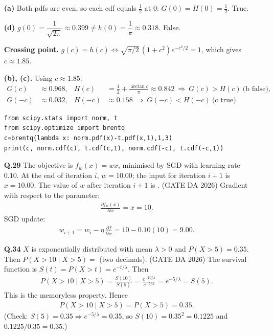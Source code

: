 \begin{enumerate}[label=\textbf{Q.\arabic*},leftmargin=*,start=1]
\textbf{(a)} Both pdfs are even, so each cdf equals $\tfrac12$ at $0$: $G(0)=H(0)=\tfrac12$. True.

\textbf{(d)} $g(0)=\dfrac1{\sqrt{2\pi}}\approx0.399\neq h(0)=\dfrac1\pi\approx0.318$. False.

\textbf{Crossing point.} $g(c)=h(c)\iff\sqrt{\pi/2}\,(1+c^2)e^{-c^2/2}=1$, which gives
$c\approx1.85$.

\textbf{(b), (c).} Using $c\approx1.85$:
\begin{align}
G(c)&\approx0.968,& H(c)&=\tfrac12+\tfrac{\arctan c}{\pi}\approx0.842\ \Rightarrow\ G(c)>H(c)\ \text{(b false)},\\
G(-c)&\approx0.032,& H(-c)&\approx0.158\ \Rightarrow\ G(-c)<H(-c)\ \text{(c true)}.
\end{align}
\begin{lstlisting}
from scipy.stats import norm, t
from scipy.optimize import brentq
c=brentq(lambda x: norm.pdf(x)-t.pdf(x,1),1,3)
print(c, norm.cdf(c), t.cdf(c,1), norm.cdf(-c), t.cdf(-c,1))
\end{lstlisting}

\item[\textbf{Q.29}] The objective is $f_w(x)=wx$, minimised by SGD with learning
rate $0.10$. At the end of iteration $i$, $w=10.00$; the input for iteration $i+1$ is
$x=10.00$. The value of $w$ after iteration $i+1$ is \underline{\hspace{1.5cm}}.
\hfill (GATE DA 2026)
\solution
Gradient with respect to the parameter:
\begin{align}
\frac{\partial f_w(x)}{\partial w}=x=10 .
\end{align}
SGD update:
\begin{align}
w_{i+1}=w_i-\eta\,\frac{\partial f}{\partial w}=10-0.10(10)=\boxed{9.00}.
\end{align}

\item[\textbf{Q.34}] $X$ is exponentially distributed with mean $\lambda>0$ and
$P(X>5)=0.35$. Then $P(X>10\mid X>5)=$ \underline{\hspace{1.5cm}} (two decimals).
\hfill (GATE DA 2026)
\solution
The survival function is $S(t)=P(X>t)=e^{-t/\lambda}$. Then
\begin{align}
P(X>10\mid X>5)=\frac{S(10)}{S(5)}=\frac{e^{-10/\lambda}}{e^{-5/\lambda}}=e^{-5/\lambda}=S(5).
\end{align}
This is the memoryless property. Hence
\begin{align}
P(X>10\mid X>5)=P(X>5)=\boxed{0.35}.
\end{align}
(Check: $S(5)=0.35\Rightarrow e^{-5/\lambda}=0.35$, so $S(10)=0.35^2=0.1225$ and $0.1225/0.35=0.35$.)


\end{enumerate}
